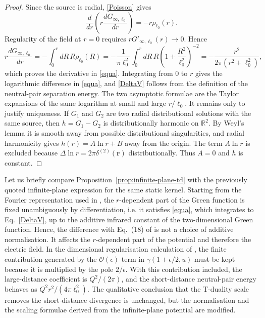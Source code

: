 \documentclass[nopacs,amsmath,amsfonts,amssymb,aps,superscriptaddress]{revtex4}
\begin{document}
\begin{proof}
Since the source is radial, \eqref{Poisson} gives
\begin{equation}
  \frac{d}{dr}\left(r\frac{dG_{\infty,\ell_0}}{dr}\right)
  =-r\rho_{\ell_0}(r).
\end{equation}
Regularity of the field at $r=0$ requires $rG'_{\infty,\ell_0}(r)\to 0$. Hence
\begin{equation}\label{intermezzo}
  r\frac{dG_{\infty,\ell_0}}{dr}
  =-\int_0^r dR\,R\rho_{\ell_0}(R)
  =-\frac{1}{\pi\ell_0^2}\int_0^r dR\,R
  \left(1+\frac{R^2}{\ell_0^2}\right)^{-2}
  =-\frac{r^2}{2\pi(r^2+\ell_0^2)},
\end{equation}
which proves the derivative in \eqref{equa}. Integrating from $0$ to $r$ gives the logarithmic difference in \eqref{equa}, and \eqref{DeltaV} follows from the definition of the neutral-pair separation energy. The two asymptotic formulae are the Taylor expansions of the same logarithm at small and large $r/\ell_0$. It remains only to justify uniqueness. If $G_1$ and $G_2$ are two radial distributional solutions with the same source, then $h=G_1-G_2$ is distributionally harmonic on $\mathbb R^2$. By Weyl's lemma it is smooth away from possible distributional singularities, and radial harmonicity gives $h(r)=A\ln r+B$ away from the origin. The term $A\ln r$ is excluded because $\Delta\ln r=2\pi\delta^{(2)}(\mathbf r)$ distributionally. Thus $A=0$ and $h$ is constant.
\end{proof}

Let us briefly compare Proposition~\ref{prop:infinite-plane-td} with the previously quoted infinite-plane expression for the same static kernel. Starting from the Fourier representation used in \cite{GaeteNicolini2026}, the $r$-dependent part of the Green function is fixed unambiguously by differentiation, i.e. it satisfies \eqref{equa}, which integrates to Eq.~\eqref{DeltaV}, up to the additive infrared constant of the two-dimensional Green function. Hence, the difference with Eq.~(18) of \cite{GaeteNicolini2026} is not a choice of additive normalisation. It affects the $r$-dependent part of the potential and therefore the electric field. In the dimensional regularisation calculation of \cite{GaeteNicolini2026}, the finite contribution generated by the $\mathcal O(\epsilon)$ term in $\gamma(1+\epsilon/2,u)$ must be kept because it is multiplied by the pole $2/\epsilon$. With this contribution included, the large-distance coefficient is $Q^2/(2\pi)$, and the short-distance neutral-pair energy behaves as $Q^2r^2/(4\pi\ell_0^2)$. The qualitative conclusion that the T-duality scale removes the short-distance divergence is unchanged, but the normalisation and the scaling formulae derived from the infinite-plane potential are modified.
\end{document}
